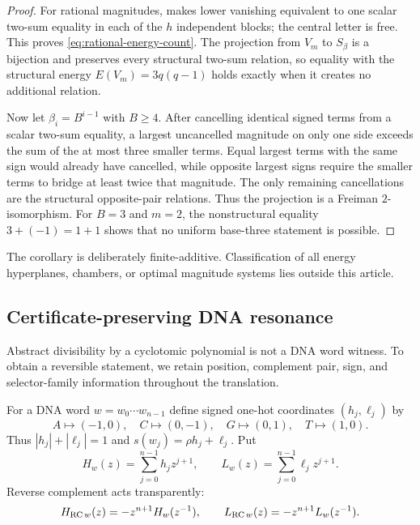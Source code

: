 \begin{proof}
For rational magnitudes,  makes lower vanishing
equivalent to one scalar two-sum equality in each of the $h$ independent
blocks; the central letter is free.  This proves
\eqref{eq:rational-energy-count}.  The projection from $V_m$ to $S_\beta$ is
a bijection and preserves every structural two-sum relation, so equality with
the structural energy $E(V_m)=3q(q-1)$ holds exactly when it creates no
additional relation.

Now let $\beta_i=B^{i-1}$ with $B\ge4$.  After cancelling identical signed
terms from a scalar two-sum equality, a largest uncancelled magnitude on only
one side exceeds the sum of the at most three smaller terms.  Equal largest
terms with the same sign would already have cancelled, while opposite largest
signs require the smaller terms to bridge at least twice that magnitude.
The only remaining cancellations are the structural opposite-pair relations.
Thus the projection is a Freiman $2$-isomorphism.  For $B=3$ and $m=2$, the
nonstructural equality $3+(-1)=1+1$ shows that no uniform base-three statement
is possible.
\end{proof}

The corollary is deliberately finite-additive.  Classification of all
energy hyperplanes, chambers, or optimal magnitude systems lies outside this
article.

\subsection{Certificate-preserving DNA resonance}
\label{sec:dna-certificates}

Abstract divisibility by a cyclotomic polynomial is not a DNA word witness.
To obtain a reversible statement, we retain position, complement pair, sign,
and selector-family information throughout the translation.

For a DNA word $w=w_0\cdots w_{n-1}$ define signed one-hot coordinates
$(h_j,\ell_j)$ by
\[
  A\mapsto(-1,0),\quad C\mapsto(0,-1),\quad
  G\mapsto(0,1),\quad T\mapsto(1,0).
\]
Thus $|h_j|+|\ell_j|=1$ and $s(w_j)=\rho h_j+\ell_j$.  Put
\begin{equation}
  H_w(z)=\sum_{j=0}^{n-1}h_jz^{j+1},\qquad
  L_w(z)=\sum_{j=0}^{n-1}\ell_jz^{j+1}.                                 \label{eq:HL}
\end{equation}
Reverse complement acts transparently:
\begin{equation}
  H_{\operatorname{RC} w}(z)=-z^{n+1}H_w(z^{-1}),\qquad
  L_{\operatorname{RC} w}(z)=-z^{n+1}L_w(z^{-1}).                                     \label{eq:HLrc}
\end{equation}

